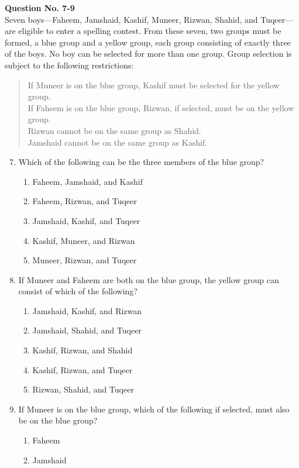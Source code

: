 \documentclass[12pt]{article}
\begin{document}
\begin{enumerate}[label=\textbf{\arabic*.}, start=1]
{\large\noindent\textbf{Question No. 7-9}}\\[10pt]
Seven boys---Faheem, Jamshaid, Kashif, Muneer, Rizwan, Shahid, and Tuqeer---are eligible to enter a spelling contest. From these seven, two groups must be formed, a blue group and a yellow group, each group consisting of exactly three of the boys. No boy can be selected for more than one group. Group selection is subject to the following restrictions:
\begin{quote}
If Muneer is on the blue group, Kashif must be selected for the yellow group.\\
If Faheem is on the blue group, Rizwan, if selected, must be on the yellow group.\\
Rizwan cannot be on the same group as Shahid.\\
Jamshaid cannot be on the same group as Kashif.
\end{quote}
\begin{enumerate}
\setcounter{enumi}{6}
\item Which of the following can be the three members of the blue group?
\begin{enumerate}[label=(\Alph*)]
    \item Faheem, Jamshaid, and Kashif
    \item Faheem, Rizwan, and Tuqeer
    \item Jamshaid, Kashif, and Tuqeer
    \item Kashif, Muneer, and Rizwan
    \item Muneer, Rizwan, and Tuqeer
\end{enumerate}
\item If Muneer and Faheem are both on the blue group, the yellow group can consist of which of the following?
\begin{enumerate}[label=(\Alph*)]
    \item Jamshaid, Kashif, and Rizwan
    \item Jamshaid, Shahid, and Tuqeer
    \item Kashif, Rizwan, and Shahid
    \item Kashif, Rizwan, and Tuqeer
    \item Rizwan, Shahid, and Tuqeer
\end{enumerate}
\item If Muneer is on the blue group, which of the following if selected, must also be on the blue group?
\begin{enumerate}[label=(\Alph*)]
    \item Faheem
    \item Jamshaid

\end{enumerate}
\end{enumerate}
\end{enumerate}
\end{document}
